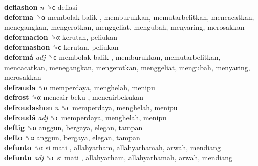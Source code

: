 \textbf{deflashon} \emph{n}  ␝ϲ  deflasi  \\
\textbf{deforma} ␝α   membolak-balik , memburukkan, memutarbelitkan, mencacatkan, menegangkan, mengerotkan, menggeliat, mengubah, menyaring, merosakkan  \\
\textbf{deformacion} ␝α  kerutan, peliukan  \\
\textbf{deformashon} ␝ϲ  kerutan, peliukan  \\
\textbf{deformá} \emph{adj}  ␝ϲ   membolak-balik , memburukkan, memutarbelitkan, mencacatkan, menegangkan, mengerotkan, menggeliat, mengubah, menyaring, merosakkan  \\
\textbf{defrauda} ␝α  memperdaya, menghelah, menipu  \\
\textbf{defrost} ␝α   mencair beku , mencairbekukan  \\
\textbf{defroudashon} \emph{n}  ␝ϲ  memperdaya, menghelah, menipu  \\
\textbf{defroudá} \emph{adj}  ␝ϲ  memperdaya, menghelah, menipu  \\
\textbf{deftig} ␝α  anggun, bergaya, elegan, tampan  \\
\textbf{defto} ␝α  anggun, bergaya, elegan, tampan  \\
\textbf{defunto} ␝α   si mati , allahyarham, allahyarhamah, arwah, mendiang  \\
\textbf{defuntu} \emph{adj}  ␝ϲ   si mati , allahyarham, allahyarhamah, arwah, mendiang  \\
